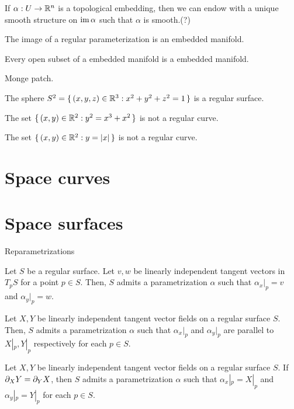 \documentclass{../../large}
\begin{document}
\begin{prb}

If $\alpha:U\to\mathbb{R}^n$ is a topological embedding, then we can endow with a unique smooth structure on $\operatorname{im}\alpha$ such that $\alpha$ is smooth.(?)
\begin{parts}
\item The image of a regular parameterization is an embedded manifold.
\item Every open subset of a embedded manifold is a embedded manifold.
\item Monge patch.
\item The sphere $S^2=\{\,(x,y,z)\in\mathbb{R}^3:x^2+y^2+z^2=1\,\}$ is a regular surface.
\item The set $\{\,(x,y)\in\mathbb{R}^2:y^2=x^3+x^2\,\}$ is not a regular curve.
\item The set $\{\,(x,y)\in\mathbb{R}^2:y=|x|\,\}$ is not a regular curve.
\end{parts}
\end{prb}


\section{Space curves}

\section{Space surfaces}



Reparametrizations

\begin{thm}
Let $S$ be a regular surface.
Let $v,w$ be linearly independent tangent vectors in $T_pS$ for a point $p\in S$.
Then, $S$ admits a parametrization $\alpha$ such that $\alpha_x|_p=v$ and $\alpha_y|_p=w$.
\end{thm}
\begin{thm}
Let $X,Y$ be linearly independent tangent vector fields on a regular surface $S$.
Then, $S$ admits a parametrization $\alpha$ such that $\alpha_x|_p$ and $\alpha_y|_p$ are parallel to $X|_p,Y|_p$ respectively for each $p\in S$.
\end{thm}
\begin{thm}
Let $X,Y$ be linearly independent tangent vector fields on a regular surface $S$.
If $\pd_XY=\pd_YX$, then $S$ admits a parametrization $\alpha$ such that $\alpha_x|_p=X|_p$ and $\alpha_y|_p=Y|_p$ for each $p\in S$.
\end{thm}
\end{document}
